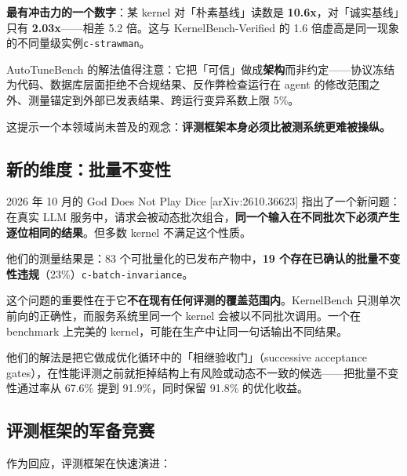 \textbf{最有冲击力的一个数字}：某 kernel 对「朴素基线」读数是 \textbf{10.6x}，对「诚实基线」只有 \textbf{2.03x}——相差 5.2 倍。这与 KernelBench-Verified 的 1.6 倍虚高是同一现象的不同量级实例{\scriptsize\texttt{c-\hspace{0pt}strawman}}。


AutoTuneBench 的解法值得注意：它把「可信」做成\textbf{架构}而非约定——协议冻结为代码、数据库层面拒绝不合规结果、反作弊检查运行在 agent 的修改范围之外、测量锚定到外部已发表结果、跨运行变异系数上限 5\%。


这提示一个本领域尚未普及的观念：\textbf{评测框架本身必须比被测系统更难被操纵。}


\subsection{新的维度：批量不变性}

2026 年 10 月的 God Does Not Play Dice [arXiv:2610.36623] 指出了一个新问题：在真实 LLM 服务中，请求会被动态批次组合，\textbf{同一个输入在不同批次下必须产生逐位相同的结果}。但多数 kernel 不满足这个性质。


他们的测量结果是：83 个可批量化的已发布产物中，\textbf{19 个存在已确认的批量不变性违规}（23\%）{\scriptsize\texttt{c-\hspace{0pt}batch-\hspace{0pt}invariance}}。


这个问题的重要性在于它\textbf{不在现有任何评测的覆盖范围内}。KernelBench 只测单次前向的正确性，而服务系统里同一个 kernel 会被以不同批次调用。一个在 benchmark 上完美的 kernel，可能在生产中让同一句话输出不同结果。


他们的解法是把它做成优化循环中的「相继验收门」（successive acceptance gates），在性能评测之前就拒掉结构上有风险或动态不一致的候选——把批量不变性通过率从 67.6\% 提到 91.9\%，同时保留 91.8\% 的优化收益。


\subsection{评测框架的军备竞赛}

作为回应，评测框架在快速演进：


